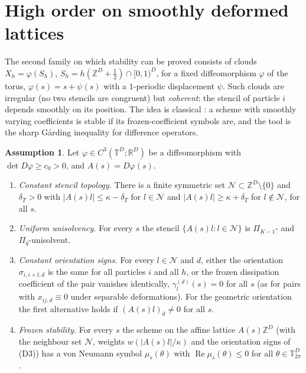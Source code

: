 \documentclass[11pt,a4paper]{article}
\theoremstyle{plain}
\theoremstyle{definition}
\newtheorem{assumption}[theorem]{Assumption}
\theoremstyle{remark}
\numberwithin{equation}{section}
\newcommand{\R}{\mathbb{R}}
\newcommand{\Z}{\mathbb{Z}}
\newcommand{\T}{\mathbb{T}}
\renewcommand{\Re}{\operatorname{Re}}
\begin{document}
\section{High order on smoothly deformed lattices}\label{sec:deformed}

The second family on which stability can be proved consists of clouds $X_h=\varphi(S_h)$, $S_h=h(\Z^D+\tfrac12)\cap[0,1)^D$, for a fixed diffeomorphism $\varphi$ of the torus, $\varphi(s)=s+\psi(s)$ with a $1$-periodic displacement $\psi$. Such clouds are irregular (no two stencils are congruent) but \emph{coherent}: the stencil of particle $i$ depends smoothly on its position. The idea is classical \cite{Kreiss1964,LaxNirenberg1966}: a scheme with smoothly varying coefficients is stable if its frozen-coefficient symbols are, and the tool is the sharp G{\aa}rding inequality for difference operators.

\begin{assumption}\label{ass:deformed}
Let $\varphi\in C^3(\T^D;\R^D)$ be a diffeomorphism with $\det D\varphi\ge c_0>0$, and $A(s)=D\varphi(s)$.
\begin{enumerate}[label=(D\arabic*)]
\item \emph{Constant stencil topology.} There is a finite symmetric set $\mathcal N\subset\Z^D\setminus\{0\}$ and $\delta_T>0$ with $|A(s)l|\le\kappa-\delta_T$ for $l\in\mathcal N$ and $|A(s)l|\ge\kappa+\delta_T$ for $l\notin\mathcal N$, for all $s$.
\item \emph{Uniform unisolvency.} For every $s$ the stencil $\{A(s)l:l\in\mathcal N\}$ is $\Pi_{K-1}$- and $\Pi_q$-unisolvent.
\item \emph{Constant orientation signs.} For every $l\in\mathcal N$ and $d$, either the orientation $\sigma_{i,i+l,d}$ is the same for all particles $i$ and all $h$, or the frozen dissipation coefficient of the pair vanishes identically, $\gamma^{(d)}_l(s)=0$ for all $s$ (as for pairs with $x_{ij,d}\equiv0$ under separable deformations). For the geometric orientation the first alternative holds if $(A(s)l)_d\ne0$ for all $s$.
\item \emph{Frozen stability.} For every $s$ the scheme on the affine lattice $A(s)\Z^D$ (with the neighbour set $\mathcal N$, weights $w(|A(s)l|/\kappa)$ and the orientation signs of (D3)) has a von Neumann symbol $\mu_s(\theta)$ with $\Re\mu_s(\theta)\le0$ for all $\theta\in\T^D_{2\pi}$.
\end{enumerate}
\end{assumption}
\end{document}
